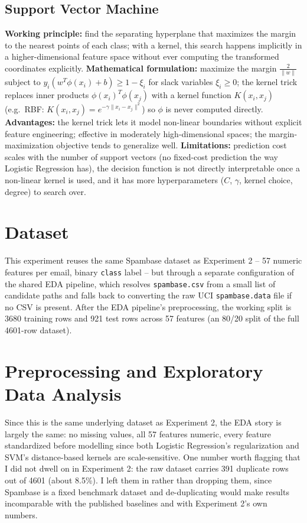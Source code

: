 \documentclass[11pt,a4paper]{article}
\begin{document}
\subsection{Support Vector Machine}
\textbf{Working principle:} find the separating hyperplane that maximizes the margin to the nearest points of each class; with a kernel, this search happens implicitly in a higher-dimensional feature space without ever computing the transformed coordinates explicitly.
\textbf{Mathematical formulation:} maximize the margin $\frac{2}{\lVert w \rVert}$ subject to $y_i(w^T\phi(x_i)+b) \geq 1-\xi_i$ for slack variables $\xi_i \geq 0$; the kernel trick replaces inner products $\phi(x_i)^T\phi(x_j)$ with a kernel function $K(x_i,x_j)$ (e.g.\ RBF: $K(x_i,x_j)=e^{-\gamma\lVert x_i-x_j\rVert^2}$) so $\phi$ is never computed directly.
\textbf{Advantages:} the kernel trick lets it model non-linear boundaries without explicit feature engineering; effective in moderately high-dimensional spaces; the margin-maximization objective tends to generalize well.
\textbf{Limitations:} prediction cost scales with the number of support vectors (no fixed-cost prediction the way Logistic Regression has), the decision function is not directly interpretable once a non-linear kernel is used, and it has more hyperparameters ($C$, $\gamma$, kernel choice, degree) to search over.

\section{Dataset}
This experiment reuses the same Spambase dataset as Experiment 2 -- 57 numeric features per email, binary \texttt{class} label -- but through a separate configuration of the shared EDA pipeline, which resolves \texttt{spambase.csv} from a small list of candidate paths and falls back to converting the raw UCI \texttt{spambase.data} file if no CSV is present. After the EDA pipeline's preprocessing, the working split is 3680 training rows and 921 test rows across 57 features (an 80/20 split of the full 4601-row dataset).

\section{Preprocessing and Exploratory Data Analysis}
Since this is the same underlying dataset as Experiment 2, the EDA story is largely the same: no missing values, all 57 features numeric, every feature standardized before modelling since both Logistic Regression's regularization and SVM's distance-based kernels are scale-sensitive. One number worth flagging that I did not dwell on in Experiment 2: the raw dataset carries 391 duplicate rows out of 4601 (about 8.5\%). I left them in rather than dropping them, since Spambase is a fixed benchmark dataset and de-duplicating would make results incomparable with the published baselines and with Experiment 2's own numbers.
\end{document}

